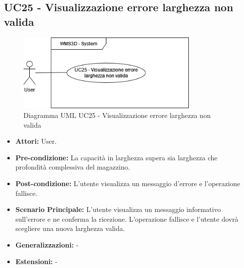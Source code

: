 \subsection{UC25 - Visualizzazione errore larghezza non valida}
\begin{figure}[H]
  \centering
  \includegraphics[width=0.8\textwidth]{UC_diagrams_21-26/UC25.drawio.png}
   \caption{Diagramma UML UC25 - Visualizzazione errore larghezza non valida}
\end{figure}
\begin{itemize}
    \item \textbf{Attori:} User.
    \item \textbf{Pre-condizione:}  La capacità in larghezza supera sia larghezza che profondità complessiva del magazzino.
    \item \textbf{Post-condizione:} L'utente visualizza un messaggio d'errore e l'operazione fallisce.
    \item \textbf{Scenario Principale:}  L'utente visualizza un messaggio informativo sull'errore e ne conferma la ricezione. L'operazione fallisce e l'utente dovrà scegliere una nuova larghezza valida.
    \item \textbf{Generalizzazioni:} -
    \item \textbf{Estensioni:} -
\end{itemize}